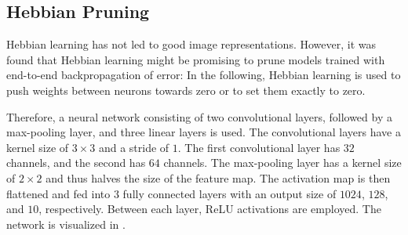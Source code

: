 \subsection{Hebbian Pruning}
Hebbian learning has not led to good image representations.
However, it was found that Hebbian learning might be promising to prune models trained with end-to-end backpropagation of error:
In the following, Hebbian learning is used to push weights between neurons towards zero or to set them exactly to zero.

Therefore, a neural network consisting of two convolutional layers, followed by a max-pooling layer, and three linear layers is used.
The convolutional layers have a kernel size of $3\times3$ and a stride of $1$. The first convolutional layer has $32$ channels, and the second has $64$ channels.
The max-pooling layer has a kernel size of $2\times2$ and thus halves the size of the feature map. 
The activation map is then flattened and fed into $3$ fully connected layers with an output size of \(1024\), \(128\), and \(10\), respectively.
Between each layer, ReLU activations are employed.
The network is visualized in .

